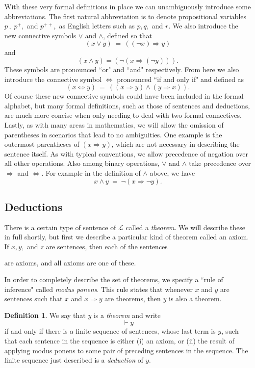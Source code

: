 \documentclass[11pt,titlepage]{article}
\newcommand{\imp}{\Rightarrow}
\newcommand{\ifff}{\Leftrightarrow}
\newcommand{\Lan}{\mathcal{L}}
\theoremstyle{definition}
\newtheorem{definition}{Definition}[subsection]
\begin{document}
With these very formal definitions in place we can unambiguously introduce some abbreviations. The first natural abbreviation is to denote propositional variables $p\,, \;p^+,$ and $p^{++},$ as English letters such as $p, q,$ and $r$. We also introduce the new connective symbols $\lor$ and $\land$, defined so that $$(x\lor y) \ = \ ((\neg x)\imp y)$$ and 
$$ (x\land y) = (\neg (x \imp (\neg y ))).$$ These symbols are pronounced ``or" and ``and" respectively. From here we also introduce the connective symbol $\ifff$ pronounced ``if and only if" and defined as $$ (x\ifff y) \ = \ ( (x\imp y) \land (y\imp x) ).$$ Of course these new connective symbols could have been included in the formal alphabet, but many formal definitions, such as those of sentences and deductions, are much more concise when only needing to deal with two formal connectives. Lastly, as with many areas in mathematics, we will allow the omission of parentheses in scenarios that lead to no ambiguities. One example is the outermost parentheses of $(x\imp y)$, which are not necessary in describing the sentence itself. As with typical conventions, we allow precedence of negation over all other operations. Also among binary operations, $\lor$ and $\land$ take precedence over $\imp$ and $\ifff$. For example in the definition of $\land$ above, we have $$ x\land y\ =\ \neg (x \imp \neg y ).$$

\subsection{Deductions}

There is a certain type of sentence of $\Lan$ called a {\em theorem}. We will describe these in full shortly, but first we describe a particular kind of theorem called an axiom. If $x, y,$ and $z$ are sentences, then each of the sentences 
are axioms, and all axioms are one of these.

In order to completely describe the set of theorems, we specify a ``rule of inference" called {\em modus ponens}. This rule states that whenever $x$ and $y$ are sentences such that $x$ and $x\imp y$ are theorems, then $y$ is also a theorem.
\begin{definition}\label{def_thm} We say that $y$ is a {\em theorem} and write $$\vdash y$$ if and only if there is a finite sequence of sentences, whose last term is $y$, such that each sentence in the sequence is either (i) an axiom, or (ii) the result of applying modus ponens to some pair of preceding sentences in the sequence. The finite sequence just described is a {\em deduction} of $y$. \end{definition}
\end{document}
